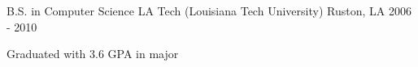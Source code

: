 

\begin{cventries}

  \cventry
    {B.S. in Computer Science} %
    {LA Tech (Louisiana Tech University)} %
    {Ruston, LA} %
    {2006 - 2010} %
    {}
    {
      \begin{cvitems} %
        \item {Graduated with 3.6 GPA in major}
      \end{cvitems}
    }

\end{cventries}
